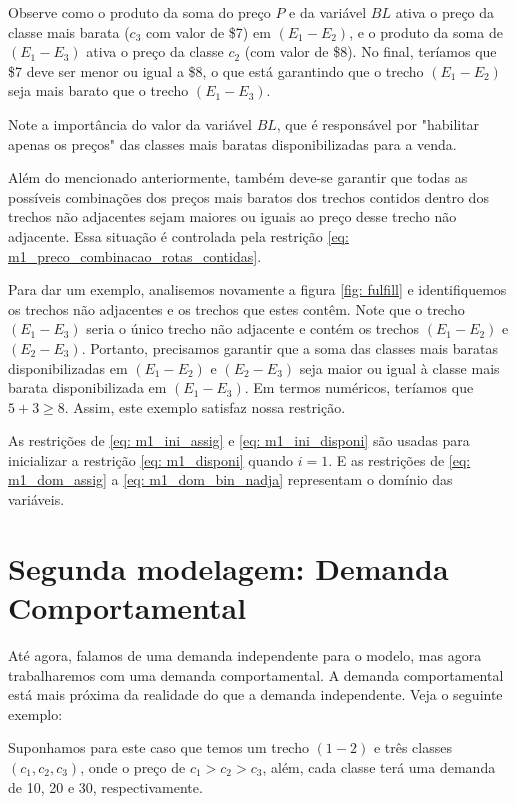 Observe como o produto da soma do preço $P$ e da variável $BL$ ativa o preço da classe mais barata ($c_3$ com valor de \$7) em $(E_1-E_2)$, e o produto da soma de $(E_1-E_3)$ ativa o preço da classe $c_2$ (com valor de \$8). No final, teríamos que \$7 deve ser menor ou igual a \$8, o que está garantindo que o trecho $(E_1-E_2)$ seja mais barato que o trecho $(E_1-E_3)$.

Note a importância do valor da variável $BL$, que é responsável por "habilitar apenas os preços" das classes mais baratas disponibilizadas para a venda.

Além do mencionado anteriormente, também deve-se garantir que todas as possíveis combinações dos preços mais baratos dos trechos contidos dentro dos trechos não adjacentes sejam maiores ou iguais ao preço desse trecho não adjacente. Essa situação é controlada pela restrição \ref{eq: m1_preco_combinacao_rotas_contidas}.

Para dar um exemplo, analisemos novamente a figura \ref{fig: fulfill} e identifiquemos os trechos não adjacentes e os trechos que estes contêm. Note que o trecho $(E_1-E_3)$ seria o único trecho não adjacente e contém os trechos $(E_1-E_2)$ e $(E_2-E_3)$. Portanto, precisamos garantir que a soma das classes mais baratas disponibilizadas em $(E_1-E_2)$ e $(E_2-E_3)$ seja maior ou igual à classe mais barata disponibilizada em $(E_1-E_3)$. Em termos numéricos, teríamos que $5+3 \geq 8$. Assim, este exemplo satisfaz nossa restrição.

As restrições de \ref{eq: m1_ini_assig} e \ref{eq: m1_ini_disponi} são usadas para inicializar a restrição \ref{eq: m1_disponi} quando \(i = 1\). E as restrições de \ref{eq: m1_dom_assig} a \ref{eq: m1_dom_bin_nadja} representam o domínio das variáveis.


\section{Segunda modelagem: Demanda Comportamental} \label{sec: modelagemComportamental}

Até agora, falamos de uma demanda independente para o modelo, mas agora trabalharemos com uma demanda comportamental. A demanda comportamental está mais próxima da realidade do que a demanda independente. Veja o seguinte exemplo:

Suponhamos para este caso que temos um trecho $(1-2)$ e três classes $(c_1, c_2, c_3)$, onde o preço de $c_1 > c_2 > c_3$, além, cada classe terá uma demanda de 10, 20 e 30, respectivamente.

